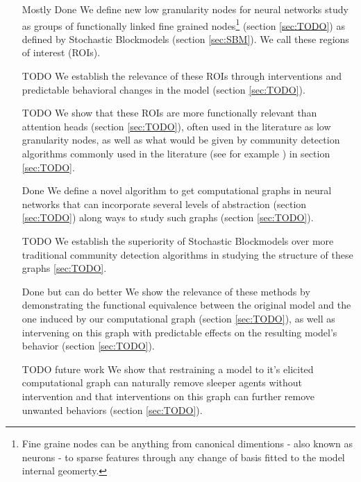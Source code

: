 \documentclass{article}
\begin{document}
\begin{itemize}
    \item[Mostly Done] We define new low granularity nodes for neural networks study as groups of functionally linked fine grained nodes\footnote{Fine graine nodes can be anything from canonical dimentions - also known as neurons - to sparse features through any change of basis fitted to the model internal geomerty.} (section \ref{sec:TODO}) as defined by Stochastic Blockmodels (section \ref{sec:SBM}). We call these regions of interest (ROIs).
    \item[TODO] We establish the relevance of these ROIs through interventions and predictable behavioral changes in the model (section \ref{sec:TODO}).
    \item[TODO] We show that these ROIs are more functionally relevant than attention heads (section \ref{sec:TODO}), often used in the literature as low granularity nodes, as well as what would be given by community detection algorithms commonly used in the literature (see for example \citet{lu2019checking, filan2021clusterability, bushnaq2024using}) in section \ref{sec:TODO}.
    \item[Done] We define a novel algorithm to get computational graphs in neural networks that can incorporate several levels of abstraction (section \ref{sec:TODO}) along ways to study such graphs (section \ref{sec:TODO}).
    \item[TODO] We establish the superiority of Stochastic Blockmodels over more traditional community detection algorithms in studying the structure of these graphs \ref{sec:TODO}.
    \item[Done but can do better] We show the relevance of these methods by demonstrating the functional equivalence between the original model and the one induced by our computational graph (section \ref{sec:TODO}), as well as intervening on this graph with predictable effects on the resulting model's behavior (section \ref{sec:TODO}).
    \item[TODO future work] We show that restraining a model to it's elicited computational graph can naturally remove sleeper agents without intervention and that interventions on this graph can further remove unwanted behaviors (section \ref{sec:TODO}).
\end{itemize}

\end{document}
